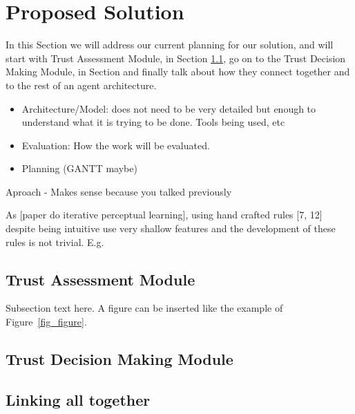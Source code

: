 \section{Proposed Solution}
\label{sec:Solution}
In this Section we will address our current planning for our solution, and will start with Trust Assessment Module, in Section \ref{subsec:Solution:Trust Assessment Module}, go on to the Trust Decision Making Module, in Section and finally talk about how they connect together and to the rest of an agent architecture.



\begin{itemize}
	\item Architecture/Model: does not need to be very detailed but enough to understand what it is trying to be done. Tools being used, etc
	\item Evaluation: How the work will be evaluated.	
	\item Planning (GANTT maybe)	
\end{itemize}Aproach - Makes sense because you talked previously


As [paper do iterative perceptual learning], using hand crafted rules [7, 12] despite being intuitive use very shallow features and the development of these rules is not trivial.
E.g.

\subsection{Trust Assessment Module}
\label{subsec:Solution:Trust Assessment Module}
Subsection text here.
A figure can be inserted like the example of Figure~\ref{fig_figure}.


\subsection{Trust Decision Making Module}
\label{subsec:Solution:Trust Decision Making Module}

\subsection{Linking all together}